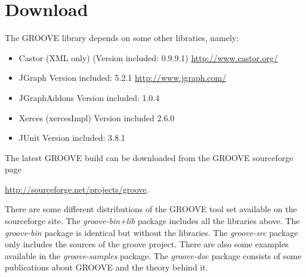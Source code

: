 \section{Download}

The GROOVE library depends on some other libraties, namely:

\begin{itemize}
\item Castor (XML only) (Version included: 0.9.9.1) \url{http://www.castor.org/}
\item JGraph Version included: 5.2.1 \url{http://www.jgraph.com/}
\item JGraphAddons Version included: 1.0.4
\item Xerces (xercesImpl) Version included 2.6.0
\item JUnit Version included: 3.8.1
\end{itemize}

The latest GROOVE build can be downloaded from the GROOVE sourceforge page 

\url{http://sourceforge.net/projects/groove}. 

There are some different distributions of the GROOVE tool set available on the sourceforge site. The \emph{groove-bin+lib} package includes all the libraries above. The \emph{groove-bin} package is identical but without the libraries. The \emph{groove-src} package only includes the sources of the groove project. There are also some examples available in the \emph{groove-samples} package. The \emph{groove-doc} package consists of some publications about GROOVE and the theory behind it. 
